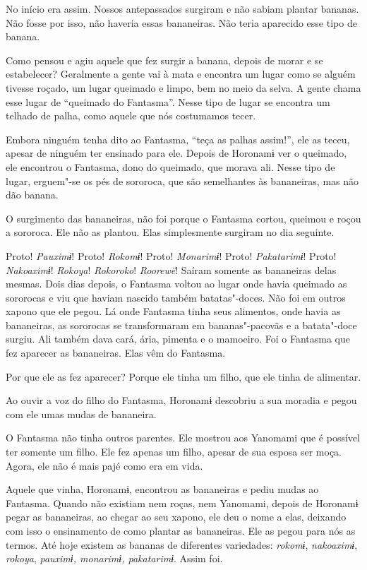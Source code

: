  

 

 No início era assim. Nossos antepassados
surgiram e não sabiam plantar bananas. Não fosse por isso, não haveria
essas bananeiras. Não teria aparecido esse tipo de banana. 

Como pensou e agiu aquele que fez surgir a banana, depois de morar e se
estabelecer? Geralmente a gente vai à mata e encontra um lugar como se
alguém tivesse roçado, um lugar queimado e limpo, bem no meio da selva.
A gente chama esse lugar de ``queimado do Fantasma''. Nesse tipo de
lugar se encontra um telhado de palha, como aquele que nós costumamos
tecer. 

Embora ninguém tenha dito ao Fantasma, ``teça as palhas assim!'', ele as
teceu, apesar de ninguém ter ensinado para ele. Depois de Horonamɨ ver o
queimado, ele encontrou o Fantasma, dono do queimado, que morava ali.
Nesse tipo de lugar, erguem"-se os pés de sororoca, que são semelhantes
às bananeiras, mas não dão banana. 

O surgimento das bananeiras, não foi porque o Fantasma cortou, queimou e
roçou a sororoca. Ele não as plantou. Elas simplesmente surgiram no dia
seguinte. 

Proto! \emph{Pauximɨ}! Proto! \emph{Rokomɨ}! Proto! \emph{Monarimɨ}!
Proto! \emph{Pakatarimɨ}!
Proto! \emph{Nakoaximɨ}! \emph{Rokoya}! \emph{Rokoroko}! \emph{Roorewë}! Saíram
somente as bananeiras delas mesmas. Dois dias depois, o Fantasma voltou
ao lugar onde havia queimado as sororocas e viu que haviam nascido
também batatas"-doces. Não foi em outros xapono que ele pegou. Lá onde
Fantasma tinha seus alimentos, onde havia as bananeiras, as sororocas se
transformaram em bananas"-pacovãs e a batata"-doce surgiu. Ali também dava
cará, ária, pimenta e o mamoeiro. Foi o Fantasma que fez aparecer as
bananeiras. Elas vêm do Fantasma. 

Por que ele as fez aparecer? Porque ele tinha um filho, que ele tinha de
alimentar. 

Ao ouvir a voz do filho do Fantasma, Horonamɨ descobriu a sua moradia e
pegou com ele umas mudas de bananeira. 

O Fantasma não tinha outros parentes. Ele mostrou aos Yanomami que é
possível ter somente um filho. Ele fez apenas um filho, apesar de sua
esposa ser moça. Agora, ele não é mais pajé como era em vida. 

Aquele que vinha, Horonamɨ, encontrou as bananeiras e pediu mudas ao
Fantasma. Quando não existiam nem roças, nem Yanomami, depois de
Horonamɨ pegar as bananeiras, ao chegar ao seu xapono, ele deu o nome a
elas, deixando com isso o ensinamento de como plantar as bananeiras. Ele
as pegou para nós as termos. Até hoje existem as bananas de diferentes
variedades: \emph{rokomɨ}, \emph{nakoaximɨ}, \emph{rokoya}, \emph{pauximɨ,
monarimɨ, pakatarimɨ}. Assim foi. 

